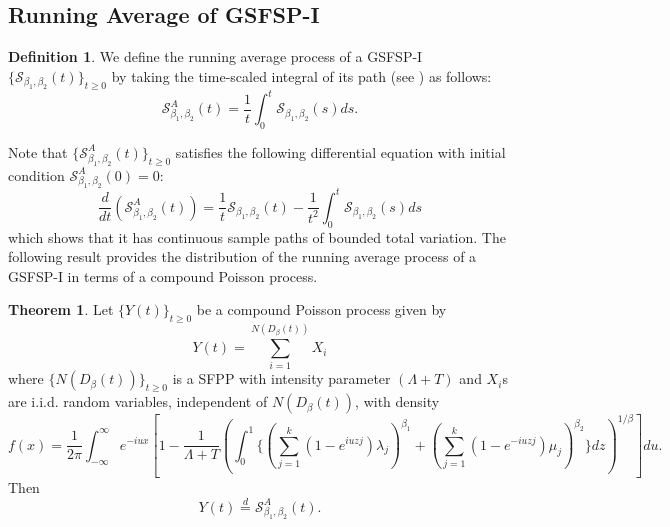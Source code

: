 \documentclass[11pt,oneside,reqno]{amsart}
\theoremstyle{definition}
\newtheorem{theorem}{\bf Theorem}[section]
\newtheorem{definition}{Definition}[section]
\theoremstyle{remarkstyle}
\begin{document}
\subsection{Running Average of GSFSP-I}
\begin{definition}\label{def_running_average_GSFSP-I}
We define the running average process of a GSFSP-I $\{\mathcal{S}_{\beta_1,\beta_2}(t)\}_{t\ge 0}$ by taking the time-scaled integral of its path (see \citet{Xia2018, Gupta2020}) as follows:
\begin{equation*}
\mathcal{S}^A_{\beta_1,\beta_2}(t)=\frac{1}{t}\int_{0}^{t}\mathcal{S}_{\beta_1,\beta_2}(s)ds. \label{78}
\end{equation*}
\end{definition}
Note that $\{\mathcal{S}^A_{\beta_1,\beta_2}(t)\}_{t \geq 0}$ satisfies the following differential equation with initial condition $\mathcal{S}^A_{\beta_1,\beta_2}(0)=0$:
\begin{equation*}
    \frac{d}{dt}(\mathcal{S}^A_{\beta_1,\beta_2}(t))=\frac{1}{t}\mathcal{S}_{\beta_1,\beta_2}(t)-\frac{1}{t^2}\int_{0}^{t}\mathcal{S}_{\beta_1,\beta_2}(s)ds    
\end{equation*}
which shows that it has continuous sample paths of bounded total variation. 
The following result provides the distribution of the running average process of a GSFSP-I in terms of a compound Poisson process. 
\begin{theorem}\label{compound.gsfsp-I}
Let $\{Y(t)\}_{t\ge 0}$ be a compound Poisson process given by
\begin{equation*}
   Y(t)=\sum_{i=1}^{N(D_{\beta}(t))}X_i
\end{equation*}
where $\{N(D_{\beta}(t))\}_{t\ge 0}$ is a SFPP with intensity parameter $(\Lambda+T)$ and $X_i$s are i.i.d. random variables, independent of $N(D_{\beta}(t))$, with density
\begin{equation*}
f(x) = \displaystyle\frac{1}{2\pi}\displaystyle\int_{-\infty}^{\infty}e^{-iux}[1-\frac{1}{\Lambda+T}(\int_{0}^{1}\{(\sum_{j=1}^{k}(1-e^{iuzj})\lambda_j)^{\beta_1} + (\sum_{j=1}^{k}(1-e^{-iuzj})\mu_j)^{\beta_2}\}dz)^{1/\beta}]du.
\end{equation*}
Then
\begin{equation*}
Y(t) \overset{d}{=} \mathcal{S}^A_{\beta_1,\beta_2}(t).
\end{equation*}
\end{theorem}
\end{document}
